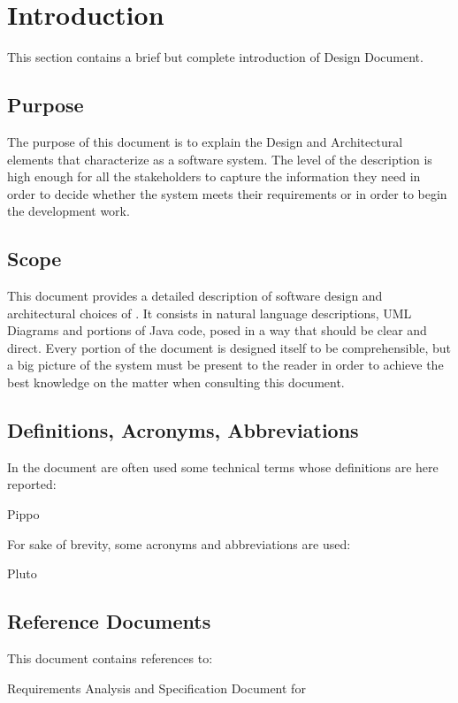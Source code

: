 \section{Introduction}
This section contains a brief but complete introduction of \myTaxiService{} Design Document.

\subsection{Purpose}
The purpose of this document is to explain the Design and Architectural elements that characterize \myTaxiService{} as a software system. The level of the description is high enough for all the stakeholders to capture the information they need in order to decide whether the system meets their requirements or in order to begin the development work.

\subsection{Scope}
This document provides a detailed description of \myTaxiService{} software design and architectural choices of \myTaxiService{}.
It consists in natural language descriptions, UML Diagrams and portions of Java code, posed in a way that should be clear and direct.
Every portion of the document is designed itself to be comprehensible, but a big picture of the system must be present to the reader in order to achieve the best knowledge on the matter when consulting this document.

\subsection{Definitions, Acronyms, Abbreviations}
In the document are often used some technical terms whose definitions are here reported:
\begin{itemize}
	 Pippo
\end{itemize}
For sake of brevity, some acronyms and abbreviations are used:
\begin{itemize}
	 Pluto
\end{itemize}

\subsection{Reference Documents}
This document contains references to:
\begin{itemize}
	  Requirements Analysis and Specification Document for \myTaxiService{}
\end{itemize}

